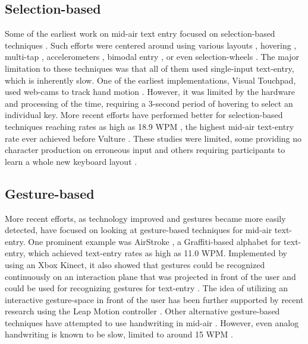 \subsection{Selection-based}
Some of the earliest work on mid-air text entry focused on selection-based techniques \cite{ref_mid_air_text_large_displays,ref_selection_based_mid_air}. Such efforts were centered around using various layouts \cite{ref_mid_air_text_large_displays,ref_selection_based_mid_air,ref_SEATO_layout_1,ref_accelerometer_text_entry}, hovering \cite{ref_visual_touchpad}, multi-tap \cite{ref_selection_based_mid_air}, accelerometers \cite{ref_accelerometer_text_entry, ref_mid_air_text_large_displays}, bimodal entry \cite{ref_mid_air_text_large_displays}, or even selection-wheels \cite{ref_mid_air_text_large_displays}. The major limitation to these techniques was that all of them used single-input text-entry, which is inherently slow. One of the earliest implementations, Visual Touchpad, used web-cams to track hand motion \cite{ref_visual_touchpad}. However, it was limited by the hardware and processing of the time, requiring a 3-second period of hovering to select an individual key. More recent efforts have performed better for selection-based techniques reaching rates as high as 18.9 WPM \cite{ref_mid_air_text_large_displays}, the highest mid-air text-entry rate ever achieved before Vulture \cite{ref_vulture}. These studies were limited, some providing no character production on erroneous input \cite{ref_mid_air_text_large_displays} and others requiring participants to learn a whole new keyboard layout \cite{ref_mid_air_text_large_displays,ref_selection_based_mid_air,ref_SEATO_layout_1,ref_SEATO_layout_2,ref_accelerometer_text_entry}.

\subsection{Gesture-based}
More recent efforts, as technology improved and gestures became more easily detected, have focused on looking at gesture-based techniques for mid-air text-entry. One prominent example was AirStroke \cite{ref_airstroke}, a Graffiti-based alphabet for text-entry, which achieved text-entry rates as high as 11.0 WPM. Implemented by using an Xbox Kinect, it also showed that gestures could be recognized continuously on an interaction plane that was projected in front of the user \cite{ref_continuous_recognition} and could be used for recognizing gestures for text-entry \cite{ref_graffiti_vs_unistroke}. The idea of utilizing an interactive gesture-space in front of the user has been further supported by recent research using the Leap Motion controller \cite{ref_alvin_thesis,ref_darren_thesis}. Other alternative gesture-based techniques have attempted to use handwriting in mid-air \cite{ref_air_handwriting,ref_air_writing_continuous_recognition,ref_mid_air_text_entry_handwriting,ref_detecting_handwritten_characters}. However, even analog handwriting is known to be slow, limited to around 15 WPM \cite{ref_handprinting_alternatives}.

